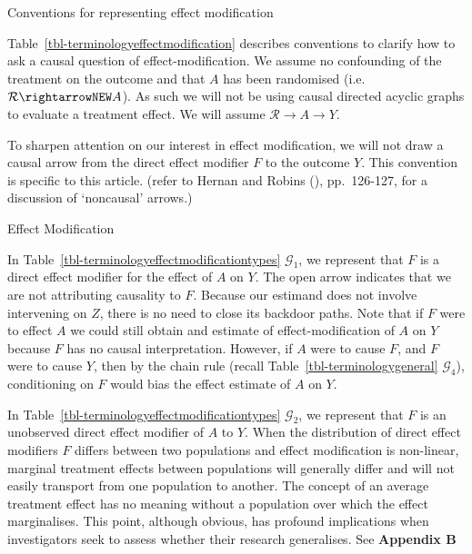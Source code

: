 \documentclass[
  single column]{article}
\begin{document}
\begin{table}

\caption{\label{tbl-terminologyeffectmodification}Conventions for
representing effect modification}

\centering{

\terminologyeffectmodification

}

\end{table}%

Table~\ref{tbl-terminologyeffectmodification} describes conventions to
clarify how to ask a causal question of effect-modification. We assume
no confounding of the treatment on the outcome and that \(A\) has been
randomised (i.e.~\(\mathcal{R} \rightarrowNEW A\)). As such we will not
be using causal directed acyclic graphs to evaluate a treatment effect.
We will assume \(\mathcal{R}  \to A \to Y\).

To sharpen attention on our interest in effect modification, we will not
draw a causal arrow from the direct effect modifier \(F\) to the outcome
\(Y\). This convention is specific to this article. (refer to Hernan and
Robins (), pp.~126-127, for a
discussion of `noncausal' arrows.)

\begin{table}

\caption{\label{tbl-terminologyeffectmodificationtypes}Effect
Modification}

\centering{

\terminologyeffectmodificationtypes

}

\end{table}%

In Table~\ref{tbl-terminologyeffectmodificationtypes} \(\mathcal{G}_1\),
we represent that \(F\) is a direct effect modifier for the effect of
\(A\) on \(Y\). The open arrow indicates that we are not attributing
causality to \(F\). Because our estimand does not involve intervening on
\(Z\), there is no need to close its backdoor paths. Note that if \(F\)
were to effect \(A\) we could still obtain and estimate of
effect-modification of \(A\) on \(Y\) because \(F\) has no causal
interpretation. However, if \(A\) were to cause \(F\), and \(F\) were to
cause \(Y\), then by the chain rule (recall
Table~\ref{tbl-terminologygeneral} \(\mathcal{G}_4\)), conditioning on
\(F\) would bias the effect estimate of \(A\) on \(Y\).

In Table~\ref{tbl-terminologyeffectmodificationtypes} \(\mathcal{G}_2\),
we represent that \(F\) is an unobserved direct effect modifier of \(A\)
to \(Y\). When the distribution of direct effect modifiers \(F\) differs
between two populations and effect modification is non-linear, marginal
treatment effects between populations will generally differ and will not
easily transport from one population to another. The concept of an
average treatment effect has no meaning without a population over which
the effect marginalises. This point, although obvious, has profound
implications when investigators seek to assess whether their research
generalises. See \textbf{Appendix B}
\end{document}
